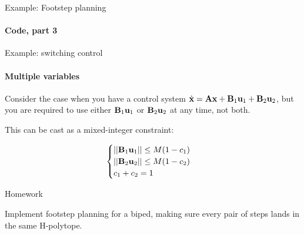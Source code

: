 \documentclass{beamer}
\begin{document}
\begin{frame}{Example: Footstep planning}
\framesubtitle{Code, part 3}
\begin{flushleft}


 
\end{flushleft}
\end{frame}



\begin{frame}{Example: switching control}
	\framesubtitle{Multiple variables}
	\begin{flushleft}
		
		Consider the case when you have a control system $\dot{\mathbf{x}} =\mathbf{A}\mathbf{x} + \mathbf{B}_1\mathbf{u}_1 + \mathbf{B}_2\mathbf{u}_2$, but you are required to use either $\mathbf{B}_1\mathbf{u}_1$ or $\mathbf{B}_2\mathbf{u}_2$ at any time, not both.
		
		\bigskip
		
		This can be cast as a mixed-integer constraint:
		
		\begin{equation}
			\begin{cases}
				||\mathbf{B}_1\mathbf{u}_1|| \leq M (1 - c_1) \\
				||\mathbf{B}_2\mathbf{u}_2|| \leq M (1 - c_2) \\
				c_1 + c_2 = 1
			\end{cases}
		\end{equation}
		
	\end{flushleft}
\end{frame}




\begin{frame}{Homework}
\begin{flushleft}

Implement footstep planning for a biped, making sure every pair of steps lands in the same H-polytope.

\end{flushleft}
\end{frame}



\myqrframe
\end{document}
